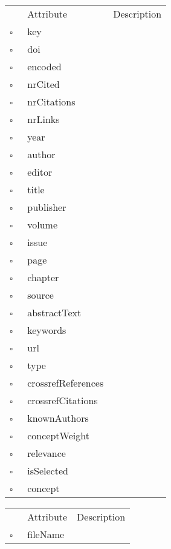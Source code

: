 \begin{table}
\caption{MissingWork  }

\begin{longtable}{llp{8cm}}
& Attribute & Description \\
$\square$\ & key &  \\
$\square$\ & doi &  \\
$\square$\ & encoded &  \\
$\square$\ & nrCited &  \\
$\square$\ & nrCitations &  \\
$\square$\ & nrLinks &  \\
$\square$\ & year &  \\
$\square$\ & author &  \\
$\square$\ & editor &  \\
$\square$\ & title &  \\
$\square$\ & publisher &  \\
$\square$\ & volume &  \\
$\square$\ & issue &  \\
$\square$\ & page &  \\
$\square$\ & chapter &  \\
$\square$\ & source &  \\
$\square$\ & abstractText &  \\
$\square$\ & keywords &  \\
$\square$\ & url &  \\
$\square$\ & type &  \\
$\square$\ & crossrefReferences &  \\
$\square$\ & crossrefCitations &  \\
$\square$\ & knownAuthors &  \\
$\square$\ & conceptWeight &  \\
$\square$\ & relevance &  \\
$\square$\ & isSelected &  \\
$\square$\ & concept &  \\
\end{longtable}
\label{attr:MissingWork}
\end{table}

\begin{table}
\caption{Orphan  }

\begin{longtable}{llp{8cm}}
& Attribute & Description \\
$\square$\ & fileName &  \\
\end{longtable}
\label{attr:Orphan}
\end{table}

